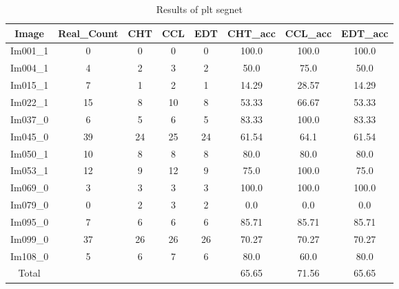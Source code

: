 \begin{table}[H]
\centering
\begin{tabular}{|c|c|c|c|c|c|c|c|}
\hline
 \textbf{Image} & \textbf{Real\_Count} & \textbf{CHT} & \textbf{CCL} & \textbf{EDT} & \textbf{CHT\_acc} & \textbf{CCL\_acc} & \textbf{EDT\_acc} \\ \hline
 Im001\_1 & 0 & 0 & 0 & 0 & 100.0 & 100.0 & 100.0 \\ 
 Im004\_1 & 4 & 2 & 3 & 2 & 50.0 & 75.0 & 50.0 \\ 
 Im015\_1 & 7 & 1 & 2 & 1 & 14.29 & 28.57 & 14.29 \\ 
 Im022\_1 & 15 & 8 & 10 & 8 & 53.33 & 66.67 & 53.33 \\ 
 Im037\_0 & 6 & 5 & 6 & 5 & 83.33 & 100.0 & 83.33 \\ 
 Im045\_0 & 39 & 24 & 25 & 24 & 61.54 & 64.1 & 61.54 \\ 
 Im050\_1 & 10 & 8 & 8 & 8 & 80.0 & 80.0 & 80.0 \\ 
 Im053\_1 & 12 & 9 & 12 & 9 & 75.0 & 100.0 & 75.0 \\ 
 Im069\_0 & 3 & 3 & 3 & 3 & 100.0 & 100.0 & 100.0 \\ 
 Im079\_0 & 0 & 2 & 3 & 2 & 0.0 & 0.0 & 0.0 \\ 
 Im095\_0 & 7 & 6 & 6 & 6 & 85.71 & 85.71 & 85.71 \\ 
 Im099\_0 & 37 & 26 & 26 & 26 & 70.27 & 70.27 & 70.27 \\ 
 Im108\_0 & 5 & 6 & 7 & 6 & 80.0 & 60.0 & 80.0 \\ \hline
 Total &  &  &  &  & 65.65 & 71.56 & 65.65 \\ 

\hline
\end{tabular}
\caption{Results of plt segnet}
\label{Results of plt segnet}
\end{table}
